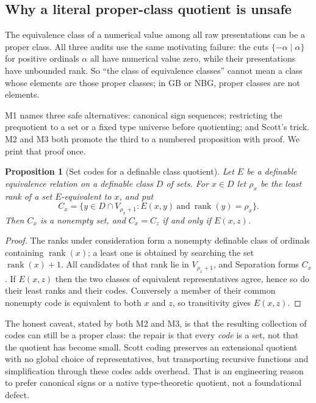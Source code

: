 \documentclass[11pt,letterpaper]{article}
\numberwithin{equation}{section}
\newtheorem{proposition}[theorem]{Proposition}
\theoremstyle{definition}
\theoremstyle{remark}
\newcommand{\rk}{\operatorname{rank}}
\begin{document}
\subsection{Why a literal proper-class quotient is unsafe}
\label{found:sub:classquotient}
The equivalence class of a numerical value among all raw presentations can be a
proper class. All three audits use the same motivating failure: the cuts
$\{-\alpha\mid\alpha\}$ for positive ordinals $\alpha$ all have numerical value
zero, while their presentations have unbounded rank. So ``the class of
equivalence classes'' cannot mean a class whose elements are those proper
classes; in GB or NBG, proper classes are not elements.

M1 names three safe alternatives: canonical sign sequences; restricting the
prequotient to a set or a fixed type universe before quotienting; and Scott's
trick. M2 and M3 both promote the third to a numbered proposition with proof.
We print that proof once.

\begin{proposition}[Set codes for a definable class quotient]\label{found:prop:scott}
Let $E$ be a definable equivalence relation on a definable class $D$ of sets.
For $x\in D$ let $\rho_x$ be the least rank of a set $E$-equivalent to $x$, and
put
\[
 C_x=\{y\in D\cap V_{\rho_x+1}:E(x,y)\ \text{and}\ \rk(y)=\rho_x\}.
\]
Then $C_x$ is a nonempty set, and $C_x=C_z$ if and only if $E(x,z)$.
\end{proposition}
\begin{proof}
The ranks under consideration form a nonempty definable class of ordinals
containing $\rk(x)$; a least one is obtained by searching the set $\rk(x)+1$.
All candidates of that rank lie in $V_{\rho_x+1}$, and Separation forms $C_x$.
If $E(x,z)$ then the two classes of equivalent representatives agree, hence so
do their least ranks and their codes. Conversely a member of their common
nonempty code is equivalent to both $x$ and $z$, so transitivity gives
$E(x,z)$.
\end{proof}

The honest caveat, stated by both M2 and M3, is that the resulting collection of
codes can still be a proper class: the repair is that every \emph{code} is a
set, not that the quotient has become small. Scott coding preserves an
extensional quotient with no global choice of representatives, but transporting
recursive functions and simplification through these codes adds overhead. That
is an engineering reason to prefer canonical signs or a native type-theoretic
quotient, not a foundational defect.
\end{document}
